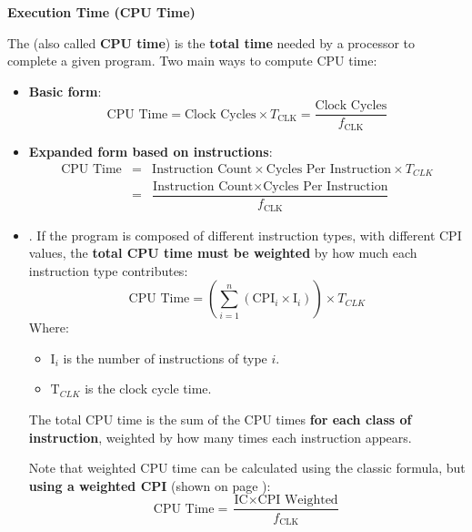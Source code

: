 \highspace
\begin{flushleft}
  \textcolor{Green3}{ \textbf{Execution Time (CPU Time)}}
\end{flushleft}
The  (also called \textbf{CPU time}) is the \textbf{total time} needed by a processor to complete a given program. Two main ways to compute CPU time:
\begin{itemize}
  \item \textbf{Basic form}:
  \begin{equation}
    \text{CPU Time} = \text{Clock Cycles} \times T_{\text{CLK}} = \frac{\text{Clock Cycles}}{f_{\text{CLK}}}
  \end{equation}


  \item \textbf{Expanded form based on instructions}:
  \begin{equation}
    \begin{array}{rcl}
      \text{CPU Time} &=& \text{Instruction Count} \times \text{Cycles Per Instruction} \times T_{CLK} \\ [1em]
      &=& \dfrac{\text{Instruction Count} \times \text{Cycles Per Instruction}}{f_{\text{CLK}}}
    \end{array}
  \end{equation}


  \item {}. If the program is composed of different instruction types, with different CPI values, the \textbf{total CPU time must be weighted} by how much each instruction type contributes:
  \begin{equation}
    \text{CPU Time} = \left( \displaystyle\sum_{i=1}^{n} (\text{CPI}_{i} \times \text{I}_{i}) \right) \times T_{CLK}
  \end{equation}
  Where:
  \begin{itemize}
    \item $\text{I}_{i}$ is the number of instructions of type $i$.
    \item $\text{T}_{CLK}$ is the clock cycle time.
  \end{itemize}
  The total CPU time is the sum of the CPU times \textbf{for each class of instruction}, weighted by how many times each instruction appears.

  Note that weighted CPU time can be calculated using the classic formula, but \textbf{using a weighted CPI} (shown on page \pageref{eq: Weighted Average CPI}):
  \begin{equation*}
    \text{CPU Time} = \dfrac{\text{IC} \times \text{CPI Weighted}}{f_{\text{CLK}}}
  \end{equation*}
\end{itemize}

